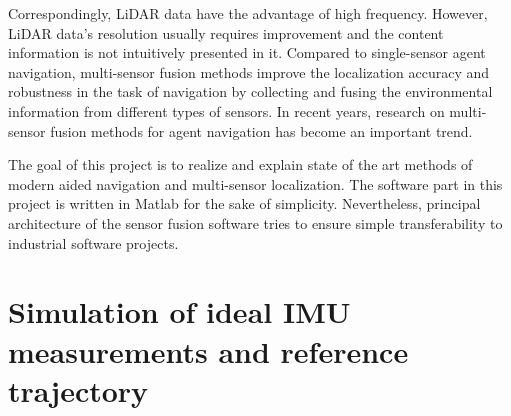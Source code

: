 \documentclass[conference]{IEEEtran}
\begin{document}
Correspondingly, LiDAR data have the advantage of high frequency. However, LiDAR data’s resolution usually requires improvement and the content information is not intuitively presented in it. Compared to single-sensor agent navigation, multi-sensor fusion methods improve the localization accuracy and robustness in the task of navigation by collecting and fusing the environmental information from different types of sensors. In recent years, research on multi-sensor fusion methods for agent navigation has become an important trend.

The goal of this project is to realize and explain state of the art methods of modern aided navigation and multi-sensor localization. The software part in this project is written in Matlab for the sake of simplicity. Nevertheless, principal architecture of the sensor fusion software tries to ensure simple transferability to industrial software projects.








\section{Simulation of ideal IMU measurements and reference trajectory}
\end{document}
